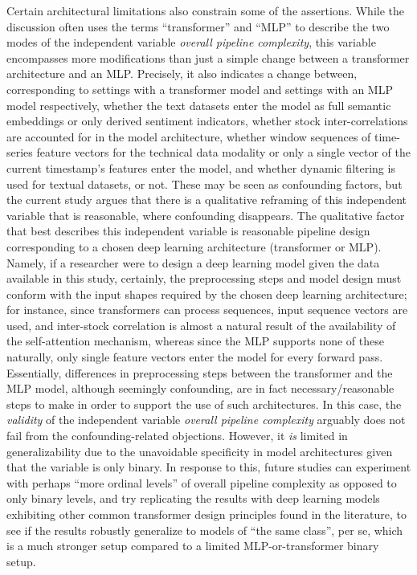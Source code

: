 \documentclass[stu,floatsintext]{apa7}
\begin{document}
Certain architectural limitations also constrain some of the assertions. While the discussion often uses the terms ``transformer'' and ``MLP'' to describe the two modes of the independent variable \textit{overall pipeline complexity}, this variable encompasses more modifications than just a simple change between a transformer architecture and an MLP. Precisely, it also indicates a change between, corresponding to settings with a transformer model and settings with an MLP model respectively, whether the text datasets enter the model as full semantic embeddings or only derived sentiment indicators, whether stock inter-correlations are accounted for in the model architecture, whether window sequences of time-series feature vectors for the technical data modality or only a single vector of the current timestamp's features enter the model, and whether dynamic filtering is used for textual datasets, or not. These may be seen as confounding factors, but the current study argues that there is a qualitative reframing of this independent variable that is reasonable, where confounding disappears. The qualitative factor that best describes this independent variable is reasonable pipeline design corresponding to a chosen deep learning architecture (transformer or MLP). Namely, if a researcher were to design a deep learning model given the data available in this study, certainly, the preprocessing steps and model design must conform with the input shapes required by the chosen deep learning architecture; for instance, since transformers can process sequences, input sequence vectors are used, and inter-stock correlation is almost a natural result of the availability of the self-attention mechanism, whereas since the MLP supports none of these naturally, only single feature vectors enter the model for every forward pass. Essentially, differences in preprocessing steps between the transformer and the MLP model, although seemingly confounding, are in fact necessary/reasonable steps to make in order to support the use of such architectures. In this case, the \textit{validity} of the independent variable \textit{overall pipeline complexity} arguably does not fail from the confounding-related objections. However, it \textit{is} limited in generalizability due to the unavoidable specificity in model architectures given that the variable is only binary. In response to this, future studies can experiment with perhaps ``more ordinal levels'' of overall pipeline complexity as opposed to only binary levels, and try replicating the results with deep learning models exhibiting other common transformer design principles found in the literature, to see if the results robustly generalize to models of ``the same class'', per se, which is a much stronger setup compared to a limited MLP-or-transformer binary setup.
\end{document}
